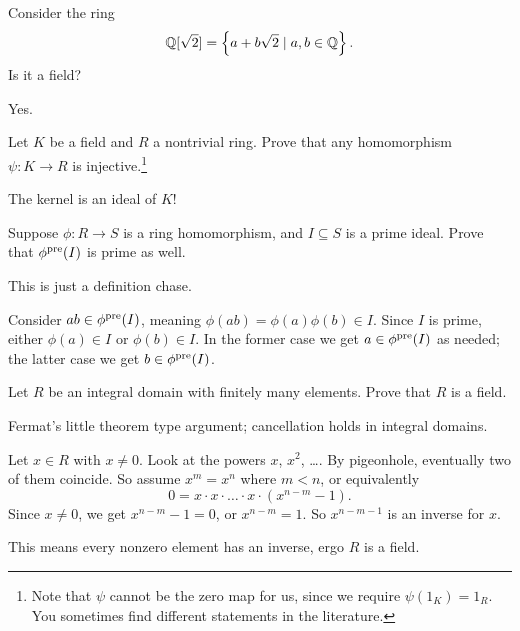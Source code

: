 \begin{problem}
	Consider the ring
	\[ \mathbb Q[\sqrt2] = \left\{ a + b\sqrt2 \mid a,b \in \mathbb Q \right\}. \]
	Is it a field?
	\begin{hint}
		Yes.
	\end{hint}
\end{problem}

\begin{problem}
	\label{prob:field_hom}
	Let $K$ be a field and $R$ a nontrivial ring.
	Prove that any homomorphism $\psi \colon K \to R$
	is injective.\footnote{Note that $\psi$
		cannot be the zero map for us,
		since we require $\psi(1_K) = 1_R$.
		You sometimes find different statements in the literature.}
	\begin{hint}
		The kernel is an ideal of $K$!
	\end{hint}
\end{problem}

\begin{sproblem}
	\label{prob:prime_preimage}
	Suppose $\phi \colon R \to S$ is a ring homomorphism,
	and $I \subseteq S$ is a prime ideal.
	Prove that $\phi^{\text{pre}}(I)$ is prime as well.
	\begin{hint}
		This is just a definition chase.
	\end{hint}
	\begin{sol}
		Consider $ab \in \phi^{\text{pre}}(I)$,
		meaning $\phi(ab) = \phi(a) \phi(b) \in I$.
		Since $I$ is prime, either $\phi(a) \in I$ or $\phi(b) \in I$.
		In the former case we get $a \in \phi^{\text{pre}}(I)$ as needed;
		the latter case we get $b \in \phi^{\text{pre}}(I)$.
	\end{sol}
\end{sproblem}

\begin{sproblem}
	\onechili
	Let $R$ be an integral domain with finitely many elements.
	Prove that $R$ is a field.
	\label{prob:finite_domain_field}
	\begin{hint}
		Fermat's little theorem type argument;
		cancellation holds in integral domains.
	\end{hint}
	\begin{sol}
		Let $x \in R$ with $x \neq 0$.
		Look at the powers $x$, $x^2$, \dots.
		By pigeonhole, eventually two of them coincide.
		So assume $x^m = x^n$ where $m < n$, or equivalently
		\[ 0  = x \cdot x \cdot \dots \cdot x
			\cdot \left( x^{n-m} - 1 \right). \]
		Since $x \neq 0$, we get $x^{n-m} - 1 = 0$,
		or $x^{n-m} = 1$.
		So $x^{n-m-1}$ is an inverse for $x$.

		This means every nonzero element has an inverse,
		ergo $R$ is a field.
	\end{sol}
\end{sproblem}

